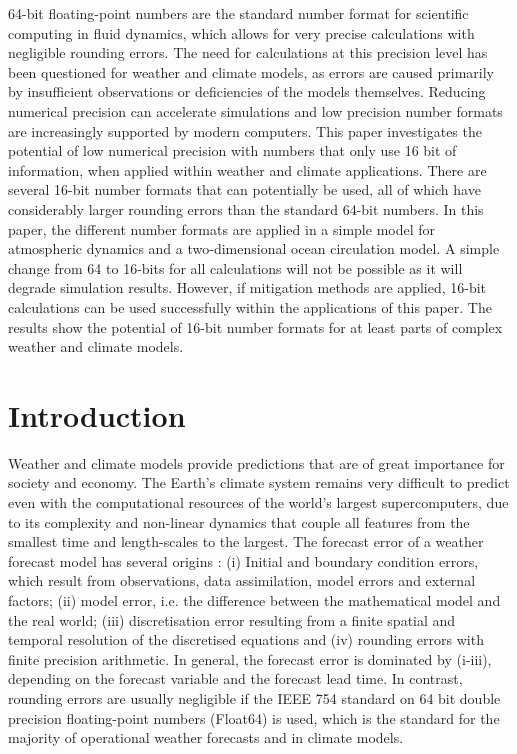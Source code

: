 \documentclass[draft]{agujournal2019}
\begin{document}
64-bit floating-point numbers are the standard number format for scientific computing in fluid dynamics, which allows for very precise calculations with negligible rounding errors. The need for calculations at this precision level has been questioned for weather and climate models, as errors are caused primarily by insufficient observations or deficiencies of the models themselves. Reducing numerical precision can accelerate simulations and low precision number formats are increasingly supported by modern computers. This paper investigates the potential of low numerical precision with numbers that only use 16 bit of information, when applied within weather and climate applications. There are several 16-bit number formats that can potentially be used, all of which have considerably larger rounding errors than the standard 64-bit numbers. In this paper, the different number formats are applied in a simple model for atmospheric dynamics and a two-dimensional ocean circulation model. A simple change from 64 to 16-bits for all calculations will not be possible as it will degrade simulation results. However, if mitigation methods are applied, 16-bit calculations can be used successfully within the applications of this paper. The results show the potential of 16-bit number formats for at least parts of complex weather and climate models.

\section{Introduction}
\label{sec:intro}

Weather and climate models provide predictions that are of great importance for society and economy. The Earth's climate system remains very difficult to predict even with the computational resources of the world's largest supercomputers, due to its complexity and non-linear dynamics that couple all features from the smallest time and length-scales to the largest. The forecast error of a weather forecast model has several origins \cite{Palmer2012,Palmer2015}: (i) Initial and boundary condition errors, which result from observations, data assimilation, model errors and external factors; (ii) model error, i.e. the difference between the mathematical model and the real world; (iii) discretisation error resulting from a finite spatial and temporal resolution of the discretised equations and (iv) rounding errors with finite precision arithmetic. In general, the forecast error is dominated by (i-iii), depending on the forecast variable and the forecast lead time. In contrast, rounding errors are usually negligible if the IEEE 754 standard on 64 bit double precision floating-point numbers (Float64) is used, which is the standard for the majority of operational weather forecasts and in climate models.
\end{document}
